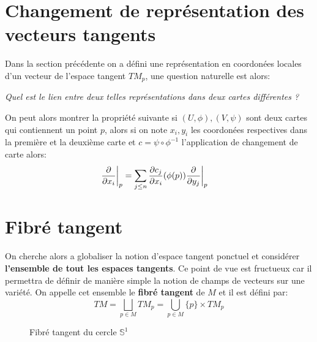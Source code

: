    \section{Changement de représentation des vecteurs tangents}
      Dans la section précédente on a défini une représentation en coordonées locales d'un vecteur de l'espace tangent \( TM_p \), une question naturelle est alors:
      \begin{center}
         \textit{Quel est le lien entre deux telles représentations dans deux cartes différentes ?}
      \end{center}
      On peut alors montrer la propriété suivante si \( (U, \phi), (V, \psi) \) sont deux cartes qui contiennent un point \( p \), alors si on note \( x_i, y_i \) les coordonées respectives dans la première et la deuxième carte et \( c = \psi \circ \phi^{-1} \) l'application de changement de carte alors:
      \begin{align*}
         \frac{\partial }{\partial x_i}\biggr|_p &= \sum_{j \leq n} \frac{\partial c_j}{\partial x_i}(\phi(p)) \frac{\partial }{\partial y_j}\biggr|_p
      \end{align*}
   \section{Fibré tangent}
   On cherche alors a globaliser la notion d'espace tangent ponctuel et considérer \textbf{l'ensemble de tout les espaces tangents}. Ce point de vue est fructueux car il permettra de définir de manière simple la notion de champs de vecteurs sur une variété. On appelle cet ensemble le \textbf{fibré tangent} de \( M \) et il est défini par:
   \[ 
      TM = \bigsqcup_{p \in M} TM_p = \bigcup_{p \in M} \{p\} \times TM_p
   \]
   \begin{figure}[h]
      \centering
      \caption{Fibré tangent du cercle \( \mathbb{S}^1 \)}
   \end{figure}

